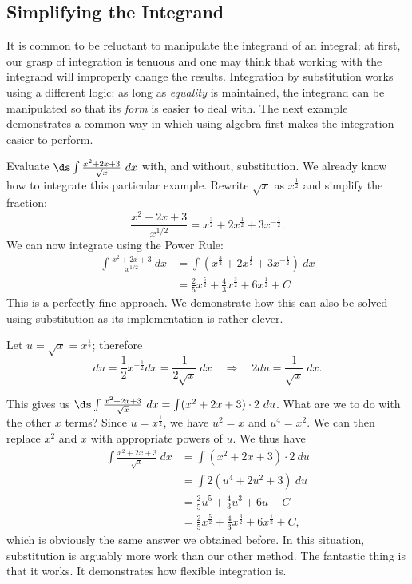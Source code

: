 \subsection{Simplifying the Integrand}

It is common to be reluctant to manipulate the integrand of an integral; at first, our grasp of integration is tenuous and one may think that working with the integrand will improperly change the results. Integration by substitution works using a different logic: as long as \emph{equality} is maintained, the integrand can be manipulated so that its \emph{form} is easier to deal with. The next example demonstrates a common way in which using algebra first makes the integration easier to perform.

\begin{example}\label{ex_sub11}
Evaluate $\ds\int \frac{x^2+2x+3}{\sqrt{x}}\ dx$ with, and without, substitution.
\solution
We already know how to integrate this particular example. Rewrite $\sqrt{x}$ as $x^\frac12$ and simplify the fraction:
	\[ \frac{x^2+2x+3}{x^{1/2}} = x^\frac32 + 2x^\frac12 + 3x^{-\frac12}.\]
We can now integrate using the Power Rule:
\begin{align*}
	\int \frac{x^2+2x+3}{x^{1/2}}\ dx &= \int\left(x^\frac32 + 2x^\frac12 + 3x^{-\frac12}\right)\ dx\\
	&=	\frac25x^\frac52 + \frac43x^\frac32 + 6x^\frac12 + C
\end{align*}
This is a perfectly fine approach. We demonstrate how this can also be solved using substitution as its implementation is rather clever.

Let $u = \sqrt{x} = x^\frac12$; therefore 
		\[du = \frac12x^{-\frac12}dx = \frac{1}{2\sqrt{x}}\ dx \quad \Rightarrow \quad 2du = \frac{1}{\sqrt{x}}\ dx.\]
		
This gives us $\ds \int \frac{x^2+2x+3}{\sqrt{x}}\ dx = \int (x^2+2x+3)\cdot2\ du$. What are we to do with the other $x$ terms? Since $u=x^{\frac12}$, we have $u^2=x$ and $u^4=x^2$. We can then replace $x^2$ and $x$ with appropriate powers of $u$. We thus have
\begin{align*}
	\int \frac{x^2+2x+3}{\sqrt{x}}\ dx
	&= \int (x^2+2x+3)\cdot2\ du\\
	&= \int 2(u^4 + 2u^2 + 3)\ du \\
	&= \frac25u^5 + \frac43u^3 + 6u + C \\
	&= \frac25x^\frac52 + \frac43x^\frac32 + 6x^\frac12+C,
\end{align*}
which is obviously the same answer we obtained before. In this situation, substitution is arguably more work than our other method. The fantastic thing is that it works. It demonstrates how flexible integration is.
\end{example}


